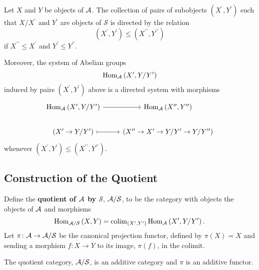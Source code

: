 \documentclass[dissertation.tex]{subfiles}
\begin{document}
\begin{prop}
  Let $X$ and $Y$ be objects of $\mathcal{A}$.
  The collection of pairs of subobjects $(X^\prime, Y^\prime)$ such that $X/X^\prime$ and $Y^\prime$ are objects of $\mathcal{S}$ is directed by the relation
  $$(X^\prime, Y^\prime) \leq (X^{\prime\prime}, Y^{\prime\prime})$$
  if $X^{\prime\prime} \leq X^\prime$ and $Y^\prime \leq Y^{\prime\prime}$.
  
  Moreover, the system of Abelian groups
  $$\operatorname{Hom}_{\mathcal{A}}\left(X^\prime, Y/Y^\prime\right)$$
  induced by pairs $(X^\prime, Y^\prime)$ above is a directed system with morphisms
  $$\begin{tikzcd}
    \Hom{\A}{X^\prime, Y/Y^\prime} \arrow{r} &\Hom{\A}{X^{\prime\prime}, Y^{\prime\prime}}\\
    (X^\prime \rightarrow Y/Y^\prime) \arrow[mapsto]{r} & (X^{\prime\prime} \rightarrow X^\prime \rightarrow Y/Y^\prime \rightarrow Y/Y^{\prime\prime})
  \end{tikzcd}$$
  whenever $(X^\prime, Y^\prime) \leq (X^{\prime\prime}, Y^{\prime\prime})$.
\end{prop}

\subsection{Construction of the Quotient}
\begin{defn}
  Define the \textbf{quotient of $\mathcal{A}$ by $\mathcal{S}$}, $\mathcal{A}/\mathcal{S}$, to be the category with objects the objects of $\mathcal{A}$ and morphisms
  $$\operatorname{Hom}_{\mathcal{A}/\mathcal{S}}\left(X, Y\right) = \operatorname{colim}_{(X^\prime, Y^\prime)} \operatorname{Hom}_{\mathcal{A}}\left(X^\prime, Y/Y^\prime\right).$$
  Let $\pi \colon \mathcal{A} \rightarrow \mathcal{A}/\mathcal{S}$ be the canonical projection functor, defined by $\pi(X) = X$ and sending a morphism $f \colon X \rightarrow Y$ to its image, $\pi(f)$, in the colimit.
\end{defn}

\begin{lem}
  The quotient category, $\mathcal{A}/\mathcal{S}$, is an additive category and $\pi$ is an additive functor.
\end{lem}
\end{document}
